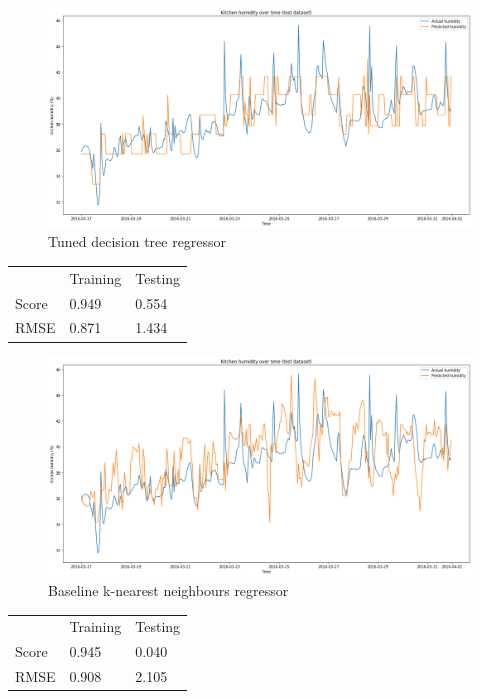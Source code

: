 \documentclass[9.5pt]{beamer}
\begin{document}
    \begin{frame}{}
        \bigskip
        \begin{figure}
            \centering
            \includegraphics[width=\linewidth]{images/tuned_tree}
            \caption{Tuned decision tree regressor}
        \end{figure}
        \small
        \begin{table}
            \begin{tabular}{l l l}
                & Training & Testing \\
                Score & 0.949    & 0.554   \\
                RMSE  & 0.871    & 1.434
            \end{tabular}
        \end{table}
    \end{frame}
    \begin{frame}{}
        \bigskip
        \begin{figure}
            \centering
            \includegraphics[width=\linewidth]{images/baseline_k}
            \caption{Baseline k-nearest neighbours regressor}
        \end{figure}
        \small
        \begin{table}
            \begin{tabular}{l l l}
                & Training & Testing \\
                Score & 0.945    & 0.040   \\
                RMSE  & 0.908    & 2.105
            \end{tabular}
        \end{table}
    \end{frame}
\end{document}
